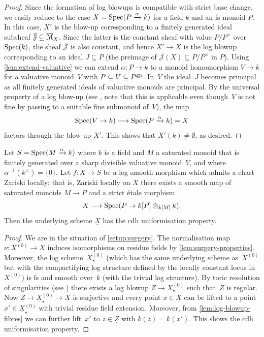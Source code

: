 \begin{proof}
Since the formation of log blowups is compatible with strict base change, we easily reduce to the case $X = \operatorname{Spec}(P\xrightarrow{\alpha} k)$ for a field $k$ and an fs monoid $P$. In this case, $X'$ is the blow-up corresponding to a finitely generated ideal subsheaf  $\overline{\mathcal{J}}\subseteq \overline{{\mathcal M}}_X$. Since the latter is the constant sheaf with value $P/P^\times$ over $\operatorname{Spec}(k)$, the sheaf $\overline{\mathcal{J}}$ is also constant, and hence $X'\to X$ is the log blowup corresponding to an ideal $J\subseteq P$ (the preimage of $\overline{\mathcal{J}}(X)\subseteq P/P^\times$ in $P$). Using \cref{lem:extend-valuative} we can extend $\alpha \colon P \to k$ to a monoid homomorphism $V \to k$ for a valuative monoid~$V$ with $P \subseteq V \subseteq P^{\rm gp}$.
In~$V$ the ideal~$J$ becomes principal as all finitely generated ideals of valuative monoids are principal.
By the universal property of a log blow-up (see \cite[Definition~III.2.6.2]{Ogus}, note that this is applicable even though~$V$ is not fine by passing to a suitable fine submonoid of~$V$), the map
\[ 
    \operatorname{Spec}(V\to k) \longrightarrow \operatorname{Spec}(P\xrightarrow{\alpha}k) = X
\]
factors through the blow-up $X'$. This shows that $X'(k)\neq \emptyset$, as desired.
\end{proof}

\begin{prop} \label{lem:log-sm-cdh-unif}
    Let $S = \operatorname{Spec}(M\xrightarrow{\alpha} k)$ where $k$ is a field and $M$ a saturated monoid that is finitely generated over a sharp divisible valuative monoid~$V$, and where $\alpha^{-1}(k^\times)=\{0\}$.
    Let $f\colon X\to S$ be a log smooth morphism which admits a chart Zariski locally; that is, Zariski locally on $X$ there exists a smooth map of saturated monoids $M\to P$ and a strict \'etale morphism
    \[
        X \longrightarrow \operatorname{Spec}(P\to k[P] \otimes_{k[M]} k).
    \]
    Then the underlying scheme $\underline{X}$ has the cdh uniformisation property.
\end{prop}

\begin{proof}
We are in the situation of \cref{setup:surgery}.
The normalisation map $\nu \colon X^{(0)} \to X$ induces isomorphisms on residue fields by \cref{lem:surgery-properties}.
Moreover, the log scheme~$X_\star^{(0)}$ (which has the same underlying scheme as~$X^{(0)}$ but with the compactifying log structure defined by the locally constant locus in~$X^{(0)}$) is fs and smooth over~$k$ (with the trivial log structure).
By toric resolution of singularities (see \cite[(10.4)]{KatoToricSingularities}) there exists a log blowup $Z \to X_\star^{(0)}$ such that~$\underline{Z}$ is regular.
Now $\underline{Z} \to \underline{X}_\star^{(0)} \to \underline{X}$ is surjective and every point $x \in \underline{X}$ can be lifted to a point $x' \in \underline{X}_\star^{(0)}$ with trivial residue field extension.
Moreover, from \cref{lem:log-blowup-fibres} we can further lift~$x'$ to $z\in \underline{Z}$  with $k(z)=k(x')$.
This shows the cdh uniformisation property.
\end{proof}

